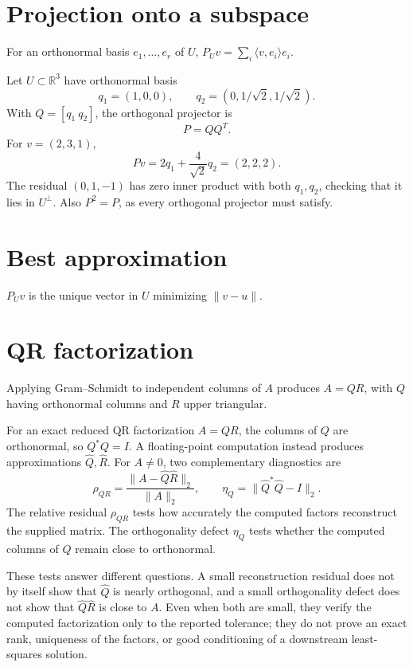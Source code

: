 \section{Projection onto a subspace}
For an orthonormal basis $e_1,\ldots,e_r$ of $U$, $P_Uv=\sum_i\langle v,e_i\rangle e_i$.


\begin{example}\label{ex:i14-expand-02}
Let \(U\subset\mathbb R^3\) have orthonormal basis
\[
q_1=(1,0,0),\qquad q_2=(0,1/\sqrt2,1/\sqrt2).
\]
With \(Q=[q_1\ q_2]\), the orthogonal projector is
\[
P=QQ^T.
\]
For \(v=(2,3,1)\),
\[
P v=2q_1+\frac{4}{\sqrt2}q_2=(2,2,2).
\]
The residual \((0,1,-1)\) has zero inner product with both \(q_1,q_2\),
checking that it lies in \(U^\perp\). Also \(P^2=P\), as every orthogonal
projector must satisfy.
\end{example}
\section{Best approximation}
$P_Uv$ is the unique vector in $U$ minimizing $\|v-u\|$.

\section{QR factorization}
Applying Gram–Schmidt to independent columns of $A$ produces $A=QR$, with $Q$ having orthonormal columns and $R$ upper triangular.

\begin{remark}
For an exact reduced QR factorization \(A=QR\), the columns of \(Q\) are
orthonormal, so \(Q^*Q=I\).  A floating-point computation instead produces
approximations \(\widehat Q,\widehat R\).  For \(A\neq0\), two complementary
diagnostics are
\[
\rho_{QR}
=
\frac{\|A-\widehat Q\widehat R\|_2}{\|A\|_2},
\qquad
\eta_Q
=
\|\widehat Q^*\widehat Q-I\|_2.
\]
The relative residual \(\rho_{QR}\) tests how accurately the computed factors
reconstruct the supplied matrix.  The orthogonality defect \(\eta_Q\) tests
whether the computed columns of \(\widehat Q\) remain close to orthonormal.

These tests answer different questions.  A small reconstruction residual does
not by itself show that \(\widehat Q\) is nearly orthogonal, and a small
orthogonality defect does not show that \(\widehat Q\widehat R\) is close to
\(A\).  Even when both are small, they verify the computed factorization only
to the reported tolerance; they do not prove an exact rank, uniqueness of the
factors, or good conditioning of a downstream least-squares solution.
\end{remark}


